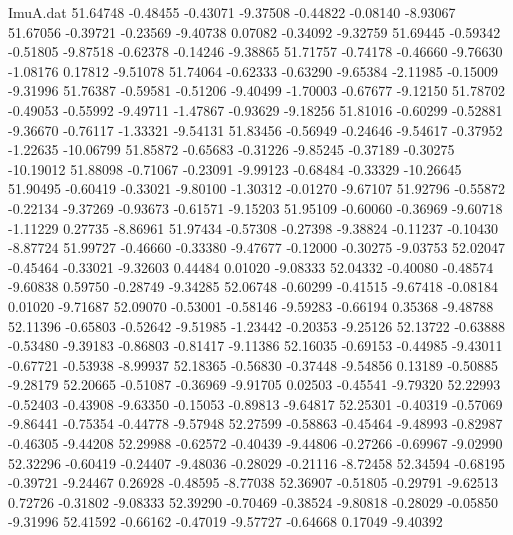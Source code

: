 \begin{filecontents}{ImuA.dat}
  51.64748   -0.48455   -0.43071   -9.37508   -0.44822   -0.08140   -8.93067
  51.67056   -0.39721   -0.23569   -9.40738    0.07082   -0.34092   -9.32759
  51.69445   -0.59342   -0.51805   -9.87518   -0.62378   -0.14246   -9.38865
  51.71757   -0.74178   -0.46660   -9.76630   -1.08176    0.17812   -9.51078
  51.74064   -0.62333   -0.63290   -9.65384   -2.11985   -0.15009   -9.31996
  51.76387   -0.59581   -0.51206   -9.40499   -1.70003   -0.67677   -9.12150
  51.78702   -0.49053   -0.55992   -9.49711   -1.47867   -0.93629   -9.18256
  51.81016   -0.60299   -0.52881   -9.36670   -0.76117   -1.33321   -9.54131
  51.83456   -0.56949   -0.24646   -9.54617   -0.37952   -1.22635  -10.06799
  51.85872   -0.65683   -0.31226   -9.85245   -0.37189   -0.30275  -10.19012
  51.88098   -0.71067   -0.23091   -9.99123   -0.68484   -0.33329  -10.26645
  51.90495   -0.60419   -0.33021   -9.80100   -1.30312   -0.01270   -9.67107
  51.92796   -0.55872   -0.22134   -9.37269   -0.93673   -0.61571   -9.15203
  51.95109   -0.60060   -0.36969   -9.60718   -1.11229    0.27735   -8.86961
  51.97434   -0.57308   -0.27398   -9.38824   -0.11237   -0.10430   -8.87724
  51.99727   -0.46660   -0.33380   -9.47677   -0.12000   -0.30275   -9.03753
  52.02047   -0.45464   -0.33021   -9.32603    0.44484    0.01020   -9.08333
  52.04332   -0.40080   -0.48574   -9.60838    0.59750   -0.28749   -9.34285
  52.06748   -0.60299   -0.41515   -9.67418   -0.08184    0.01020   -9.71687
  52.09070   -0.53001   -0.58146   -9.59283   -0.66194    0.35368   -9.48788
  52.11396   -0.65803   -0.52642   -9.51985   -1.23442   -0.20353   -9.25126
  52.13722   -0.63888   -0.53480   -9.39183   -0.86803   -0.81417   -9.11386
  52.16035   -0.69153   -0.44985   -9.43011   -0.67721   -0.53938   -8.99937
  52.18365   -0.56830   -0.37448   -9.54856    0.13189   -0.50885   -9.28179
  52.20665   -0.51087   -0.36969   -9.91705    0.02503   -0.45541   -9.79320
  52.22993   -0.52403   -0.43908   -9.63350   -0.15053   -0.89813   -9.64817
  52.25301   -0.40319   -0.57069   -9.86441   -0.75354   -0.44778   -9.57948
  52.27599   -0.58863   -0.45464   -9.48993   -0.82987   -0.46305   -9.44208
  52.29988   -0.62572   -0.40439   -9.44806   -0.27266   -0.69967   -9.02990
  52.32296   -0.60419   -0.24407   -9.48036   -0.28029   -0.21116   -8.72458
  52.34594   -0.68195   -0.39721   -9.24467    0.26928   -0.48595   -8.77038
  52.36907   -0.51805   -0.29791   -9.62513    0.72726   -0.31802   -9.08333
  52.39290   -0.70469   -0.38524   -9.80818   -0.28029   -0.05850   -9.31996
  52.41592   -0.66162   -0.47019   -9.57727   -0.64668    0.17049   -9.40392

\end{filecontents}

